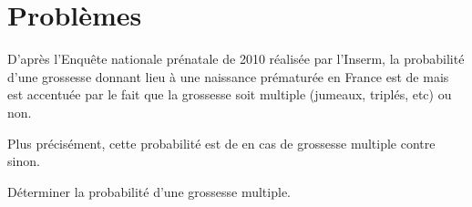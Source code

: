 \documentclass[12pt,a4paper,french]{article}
\begin{document}
\section{Problèmes}

\begin{question}[subtitle=Obstétrique--Question ouverte]
  D'après l'\og Enquête nationale prénatale \fg{} de 2010 réalisée par
  l'Inserm, la probabilité d'une grossesse donnant lieu à une naissance
  prématurée en France est de  mais est accentuée par le fait que
  la grossesse soit multiple (jumeaux, triplés, etc) ou non.

  Plus précisément, cette probabilité est de  en cas de grossesse
  multiple contre  sinon.

  Déterminer la probabilité d'une grossesse multiple.
\end{question}
\end{document}
